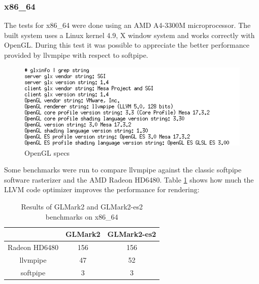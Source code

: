 \documentclass[12pt,a4paper,oneside]{article}
\begin{document}
\subsubsection*{x86\_64}
The tests for x86\_64 were done using an AMD A4-3300M microprocessor. The built
system uses a Linux kernel 4.9, X window system and works correctly with OpenGL.
During this test it was possible to appreciate the better performance provided by
llvmpipe with respect to softpipe.
\begin{figure}[H]
\centering
  \includegraphics[scale=0.75]{img/llvmpipe-glspecs.png}
  \caption{OpenGL specs}
  \label{fig:llvmpipe-glspecs}
\end{figure}
Some benchmarks were run to compare llvmpipe against the classic softpipe software
rasterizer and the AMD Radeon HD6480. Table \ref{tab:glmark2_x86} shows how much
the LLVM code optimizer improves the performance for rendering:
\begin{table}[h!]
  \begin{center}
    \caption{Results of GLMark2 and GLMark2-es2 benchmarks on x86\_64}
    \label{tab:glmark2_x86}
    \begin{tabular}{ c |c c }
    & {GLMark2} & {GLMark2-es2} \\
    \hline
    Radeon HD6480 & 156 & 156 \\
    llvmpipe & 47 & 52 \\
    softpipe & 3 & 3 \\
    \end{tabular}
  \end{center}
\end{table}

\newpage
\end{document}
